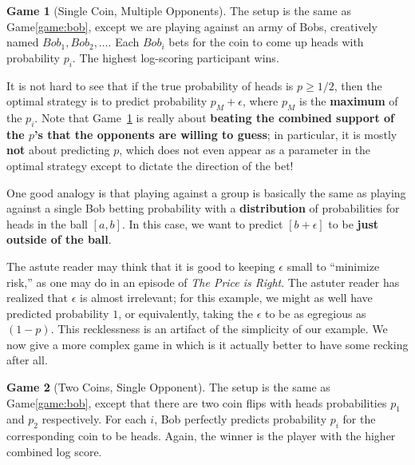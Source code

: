 \documentclass[12pt,twoside,singlespace]{article}
\numberwithin{equation}{section}
\theoremstyle{definition}
\newtheorem{game}{Game}
\begin{document}


\begin{game}[Single Coin, Multiple Opponents]
\label{game:bob-army-range}
The setup is the same as Game\ref{game:bob}, except we are playing against an army of Bobs, creatively named $Bob_1, Bob_2, \ldots$. Each $Bob_i$ bets for the coin to come up heads with probability $p_i$. The highest log-scoring participant wins.
\end{game}

It is not hard to see that if the true probability of heads is $p \geq 1/2$, then the optimal strategy is to predict probability $p_M + \epsilon$, where $p_M$ is the \textbf{maximum} of the $p_i$. Note that Game~\ref{game:bob-army-range} is really about \textbf{beating the combined support of the $p$'s that the opponents are willing to guess}; in particular, it is mostly \textbf{not} about predicting $p$, which does not even appear as a parameter in the optimal strategy except to dictate the direction of the bet!

One good analogy is that playing against a group is basically the same as playing against a single Bob betting probability with a \textbf{distribution} of probabilities for heads in the ball $[a, b]$. In this case, we want to predict $[b + \epsilon]$ to be \textbf{just outside of the ball}. 

The astute reader may think that it is good to keeping $\epsilon$ small to ``minimize risk,'' as one may do in an episode of \emph{The Price is Right}. The astuter reader has realized that $\epsilon$ is almost irrelevant; for this example, we might as well have predicted probability $1$, or equivalently, taking the $\epsilon$ to be as egregious as $(1-p)$. This recklessness is an artifact of the simplicity of our example. We now give a more complex game in which is it actually better to have some recking after all.

\begin{game}[Two Coins, Single Opponent]
\label{game:two-coins}
The setup is the same as Game\ref{game:bob}, except that there are two coin flips with heads probabilities $p_1$ and $p_2$ respectively. For each $i$, Bob perfectly predicts probability $p_i$ for the corresponding coin to be heads. Again, the winner is the player with the higher combined log score. 
\end{game}
\end{document}
